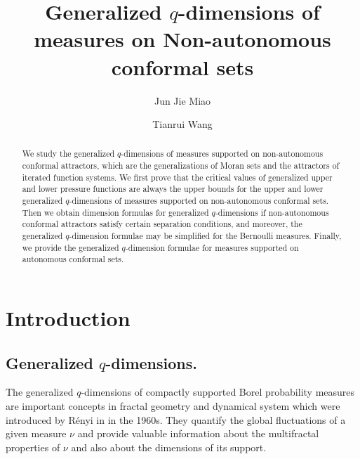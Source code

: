\documentclass[12pt]{amsart}
\title[]{Generalized $q$-dimensions of measures on  Non-autonomous conformal sets}
\date{}
\author[J. J. Miao]{Jun Jie Miao}
\author[Tianrui Wang]{Tianrui Wang}
\theoremstyle{plain}
\theoremstyle{definition}
\theoremstyle{remark}
\begin{document}
	\begin{abstract}
We study the generalized $q$-dimensions of measures supported on  non-autonomous conformal attractors,  which are the generalizations of  Moran sets and the attractors of iterated function systems. We first prove that the critical values of generalized upper and lower pressure functions are always the upper bounds for the upper and lower generalized $q$-dimensions of  measures supported on non-autonomous conformal sets. Then we obtain dimension formulas for generalized $q$-dimensions if non-autonomous conformal attractors satisfy  certain separation conditions, and moreover, the generalized $q$-dimension formulae may be simplified for the Bernoulli measures. Finally, we provide the generalized $q$-dimension formulae for measures supported on autonomous conformal sets.
	\end{abstract}
	
	\maketitle


\section{Introduction}
\subsection{Generalized $q$-dimensions.}
The generalized $q$-dimensions of compactly supported Borel probability measures are important concepts in  fractal geometry and dynamical system which were introduced by R\'{e}nyi in \cite{A.R, A.R.} in the 1960s. They  quantify the global fluctuations of a given measure $\nu$ and provide valuable information about the multifractal properties of $\nu$ and also about the dimensions of its support. 
\end{document}
